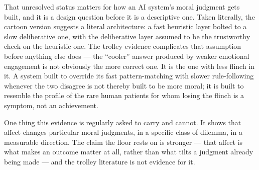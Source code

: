 That unresolved status matters for how an AI system's moral judgment gets built, and it is a design question before it is a descriptive one. Taken literally, the cartoon version suggests a literal architecture: a fast heuristic layer bolted to a slow deliberative one, with the deliberative layer assumed to be the trustworthy check on the heuristic one. The trolley evidence complicates that assumption before anything else does — the “cooler” answer produced by weaker emotional engagement is not obviously the more correct one. It is the one with less flinch in it. A system built to override its fast pattern-matching with slower rule-following whenever the two disagree is not thereby built to be more moral; it is built to resemble the profile of the rare human patients for whom losing the flinch is a symptom, not an achievement.

One thing this evidence is regularly asked to carry and cannot. It shows that affect changes particular moral judgments, in a specific class of dilemma, in a measurable direction. The claim the floor rests on is stronger — that affect is what makes an outcome matter at all, rather than what tilts a judgment already being made — and the trolley literature is not evidence for it.
